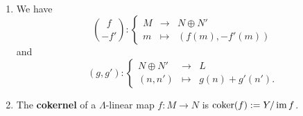 
\begin{definition}\
\begin{enumerate}
\item We have
\[
\binom{f}{-f'}:
\left\{
\begin{matrix}
M & \to & N \oplus N' \\
m & \mapsto & (f(m),-f'(m))
\end{matrix}
\right.
\]
and
\[
(g,g'):
\left\{
\begin{matrix}
N \oplus N' & \to & L \\
(n,n') & \mapsto & g(n) + g'(n').
\end{matrix}
\right.
\]
\item The \textbf{cokernel} of a $\Lambda$-linear map $f : M \to N$ is $\operatorname{coker}(f):=Y/\operatorname{im} f$.
\end{enumerate}
\end{definition}


